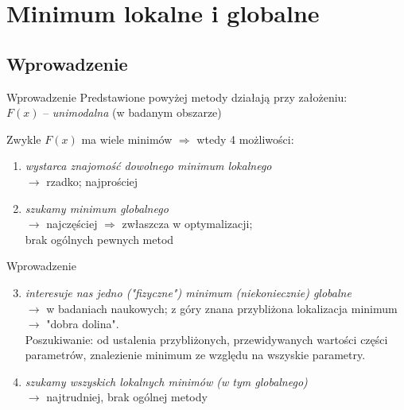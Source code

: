 \section{Minimum lokalne i globalne}

\subsection{Wprowadzenie}

  \begin{frame}{Wprowadzenie}
    Predstawione powyżej metody działają przy założeniu:\\
    $F(x)$ -- \emph{unimodalna} (w badanym obszarze)
    \begin{block}{Zwykle $F(x)$ ma wiele minimów $\Rightarrow$ wtedy 4 możliwości:}
      \begin{enumerate}
        \item \emph{wystarca znajomość dowolnego minimum lokalnego}\\
        $\to$ rzadko; najprościej
        \item \emph{szukamy minimum globalnego}\\
        $\to$ najczęściej $\Rightarrow$ zwłaszcza w optymalizacji;\\
        brak ogólnych pewnych metod %

      \end{enumerate}
    \end{block}
  \end{frame}

  \begin{frame}{Wprowadzenie}
    \begin{block}{}
      \begin{enumerate}
        \setcounter{enumi}{2}
        \item \emph{interesuje nas jedno ("fizyczne") minimum
        (niekoniecznie) globalne}\\
        $\to$ w badaniach naukowych; z góry znana przybliżona
        lokalizacja minimum $\to$ "dobra dolina". \\
        Poszukiwanie: od ustalenia przybliżonych, przewidywanych
        wartości części parametrów, znalezienie minimum ze
        względu na wszyskie parametry.
        \item \emph{szukamy wszyskich lokalnych minimów
        (w tym globalnego)} \\
        $\to$ najtrudniej, brak ogólnej metody
      \end{enumerate}
    \end{block}
  \end{frame}

